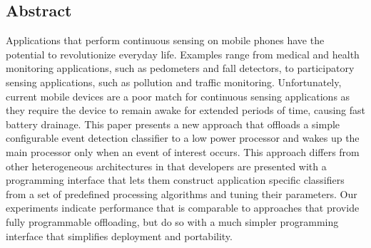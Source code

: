 \subsection*{Abstract}
 
Applications that perform continuous sensing on mobile pho\-nes have the
potential to revolutionize everyday life.  Examples range from medical
and health monitoring applications, such as pedometers and fall
detectors, to participatory sensing applications, such as pollution
and traffic monitoring.  Unfortunately, current mobile devices are a
poor match for continuous sensing applications as they require the
device to remain awake for extended periods of time, causing fast
battery drainage.  This paper presents a new approach that offloads a
simple configurable event detection classifier to a low power
processor and wakes up the main processor only when an event of
interest occurs.  This approach differs from other heterogeneous
architectures in that developers are presented with a programming
interface that lets them construct application specific classifiers
from a set of predefined processing algorithms and tuning their
parameters. Our experiments indicate performance that is comparable to 
approaches that provide fully programmable offloading, but do so 
with a much simpler programming interface that simplifies deployment 
and portability.
 
